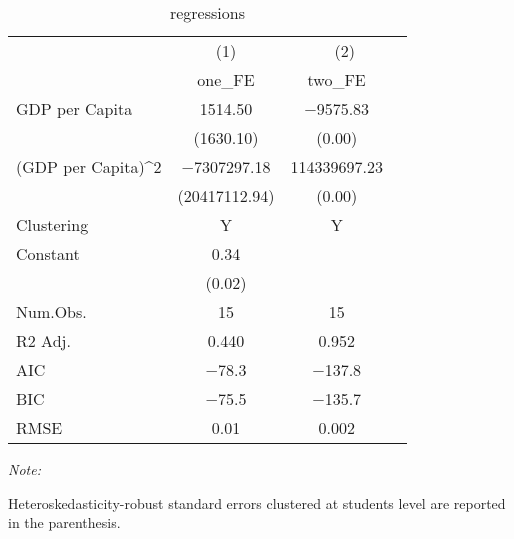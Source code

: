 \begin{table}

\caption{regressions}
\centering
\begin{threeparttable}
\begin{tabular}[t]{lcc}
\midrule\midrule
\multicolumn{0}{c}{ } & \multicolumn{1}{c}{(1)} & \multicolumn{2}{c}{(2)} \\
\cmidrule(l{3pt}r{3pt}){1-1} \cmidrule(l{3pt}r{3pt}){2-3}
  & one\_FE & two\_FE\\
\midrule
GDP per Capita & \num{1514.50} & \num{-9575.83}\\
 & (\num{1630.10}) & (\num{0.00})\\
(GDP per Capita)\textasciicircum{}2 & \num{-7307297.18} & \num{114339697.23}\\
 & (\num{20417112.94}) & (\num{0.00})\\
Clustering & Y & Y\\
Constant & \num{0.34} & \\
 & (\num{0.02}) & \\
\midrule
Num.Obs. & \num{15} & \num{15}\\
R2 Adj. & \num{0.440} & \num{0.952}\\
AIC & \num{-78.3} & \num{-137.8}\\
BIC & \num{-75.5} & \num{-135.7}\\
RMSE & \num{0.01} & \num{0.002}\\
\midrule\midrule
\end{tabular}
\begin{tablenotes}
\item \textit{Note: } 
\item Heteroskedasticity-robust standard errors clustered at students level are reported in the parenthesis.
\end{tablenotes}
\end{threeparttable}
\end{table}
